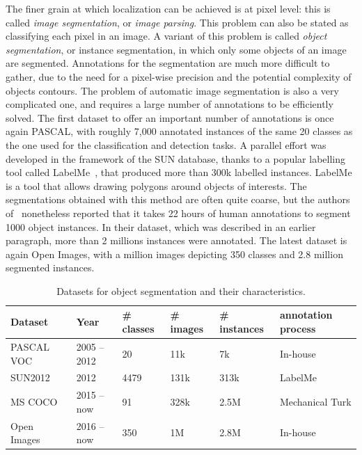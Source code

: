 The finer grain at which localization can be achieved is at pixel level:
this is called \textit{image segmentation}, or \textit{image parsing}.
This problem can also be stated as classifying each pixel in an image.
A variant of this problem is called \textit{object segmentation},
or instance segmentation, in which only some objects of an image are segmented.
Annotations for the segmentation are much more difficult to gather,
due to the need for a pixel-wise precision
and the potential complexity of objects contours.
The problem of automatic image segmentation is also a very complicated one,
and requires a large number of annotations to be efficiently solved.
The first dataset to offer an important number of annotations is once again PASCAL,
with roughly 7,000 annotated instances of the same 20 classes
as the one used for the classification and detection tasks.
A parallel effort was developed in the framework of the SUN database,
thanks to a popular labelling tool called LabelMe~\cite{russell2008labelme},
that produced more than 300k labelled instances.
LabelMe is a tool that allows drawing polygons around objects of interests.
The segmentations obtained with this method are often quite coarse,
but the authors of~\cite{lin2014microsoft} nonetheless reported that
it takes 22 hours of human annotations to segment 1000 object instances.
In their dataset, which was described in an earlier paragraph,
more than 2 millions instances were annotated.
The latest dataset is again Open Images, with a million images depicting 350 classes
and 2.8 million segmented instances.

\begin{table}
\centering
\caption{Datasets for object segmentation and their characteristics.}
\begin{tabular}{llllll}
	Dataset & Year & \# classes & \# images & \# instances & annotation process \\
	\midrule
	PASCAL VOC~\cite{Everingham10} & 2005 -- 2012 & 20 & 11k & 7k & In-house \\
	SUN2012~\cite{xiao2010sun} & 2012 & 4479 & 131k & 313k & LabelMe~\cite{russell2008labelme,barriuso2012notes} \\
	MS COCO~\cite{lin2014microsoft} & 2015 -- now & 91 & 328k & 2.5M & Mechanical Turk \\
	Open Images~\cite{OpenImages, OpenImages2} & 2016 -- now & 350 & 1M & 2.8M & In-house \\
\end{tabular}%
\label{tab:segmentation_ds}
\end{table}


